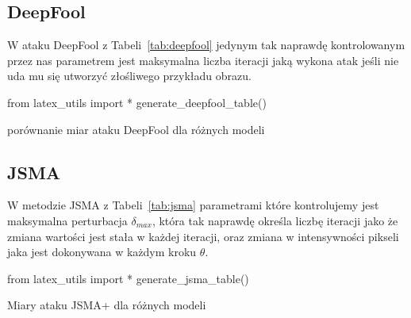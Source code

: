 \documentclass[
    left=2.5cm,         %
    right=2.5cm,        %
    top=2.5cm,          %
    bottom=3cm,         %
    bindingoffset=6mm,  %
    nohyphenation=false %
]{eiti/eiti-thesis}
\begin{document}
\subsection{DeepFool}
W ataku DeepFool z Tabeli~\ref{tab:deepfool} jedynym tak naprawdę kontrolowanym przez nas parametrem jest maksymalna
liczba iteracji jaką wykona atak jeśli nie uda mu się utworzyć złośliwego przykładu obrazu.
\begin{table}[H]
\begin{adjustbox}{max width=\textwidth}
\begin{pycode}
from latex_utils import *
generate_deepfool_table()
\end{pycode}
\end{adjustbox}
\caption{porównanie miar ataku DeepFool dla różnych modeli}
\label{tab:deepfool}
\end{table}

\subsection{JSMA}
W metodzie JSMA z Tabeli~\ref{tab:jsma} parametrami które kontrolujemy jest maksymalna perturbacja $\delta_{max}$,
która tak naprawdę określa liczbę iteracji jako że zmiana wartości jest stała w każdej iteracji,
oraz zmiana w intensywności pikseli jaka jest dokonywana w każdym kroku $\theta$.
\begin{table}[H]
\begin{adjustbox}{max width=\textwidth}
\begin{pycode}
from latex_utils import *
generate_jsma_table()
\end{pycode}
\end{adjustbox}
\caption{Miary ataku JSMA+ dla różnych modeli}
\label{tab:jsma}
\end{table}
\end{document}
